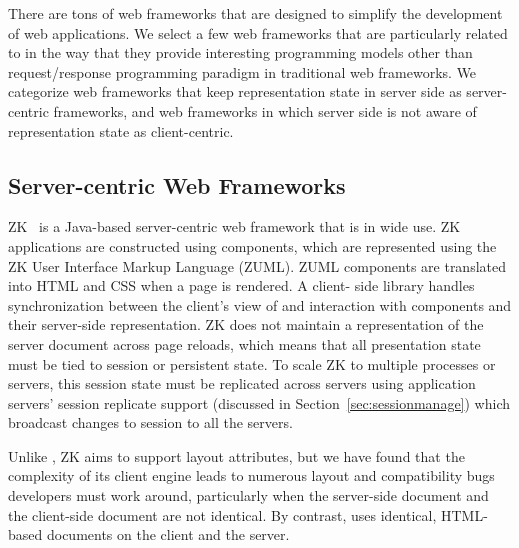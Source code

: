 
There are tons of web frameworks that are designed to simplify the development of
web applications.
We select a few web frameworks that are particularly related to \cb in the way
that they provide interesting programming models other than request/response
programming paradigm in traditional web frameworks.
We categorize web
frameworks that keep representation state in server side as server-centric
frameworks, and web frameworks in which server side is not aware of
representation state as client-centric.




%
%
\subsection{Server-centric Web Frameworks}


ZK~\cite{ChenCheng:book2007} is a Java-based server-centric web framework that
is in wide use. ZK applications are constructed using components, which are
represented using the ZK User Interface Markup Language (ZUML).  ZUML
components are translated into HTML and CSS when a page is rendered. A client-
side library handles synchronization between the client's  view of and
interaction with components and their server-side  representation.  ZK does
not maintain a representation of the server document across page reloads,
which means that all presentation state must be tied to session or persistent
state. To scale ZK to multiple processes or servers, this session state must
be replicated across servers using application servers' session replicate
support  (discussed in Section~\ref{sec:sessionmanage}) which broadcast
changes to session to all the servers.

Unlike \projectname{}, ZK aims to support layout attributes, but
we have found that the complexity of its client engine leads to 
numerous layout and compatibility bugs developers must work around,
particularly when the server-side document and the client-side
document are not identical.  By contrast, \cb uses identical, HTML-based
documents on the client and the server.

